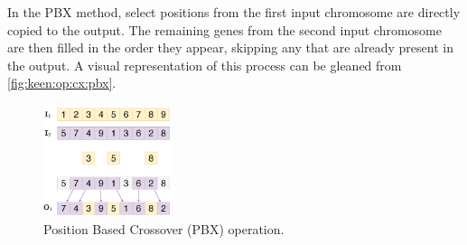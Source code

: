   In the PBX method, select positions from the first input chromosome are 
  directly copied to the output. The remaining genes from the second input 
  chromosome are then filled in the order they appear, skipping any that are 
  already present in the output. A visual representation of this process can be 
  gleaned from \vref{fig:keen:op:cx:pbx}.

  \begin{figure}[ht!]
    \centering
    \includegraphics[width=0.33\textwidth]{img/keen/PBX.png}
    \caption{Position Based Crossover (PBX) operation.}
    \label{fig:keen:op:cx:pbx}
  \end{figure}